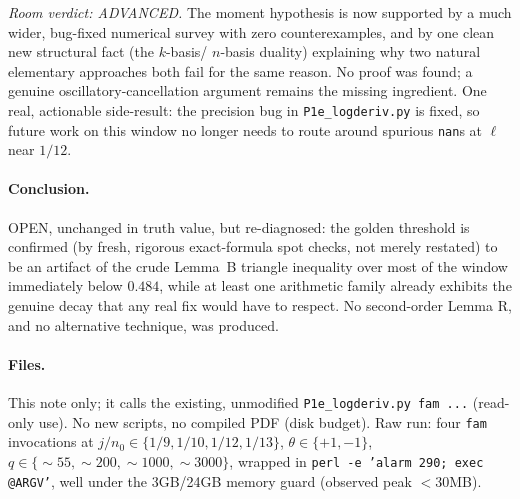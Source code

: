\documentclass[11pt]{article}
\theoremstyle{remark}\newtheorem{remark}[theorem]{Remark}
\begin{document}
\emph{Room verdict: ADVANCED.} The moment hypothesis is now supported by a much wider, bug-fixed
numerical survey with zero counterexamples, and by one clean new structural fact (the $k$-basis/
$n$-basis duality) explaining why two natural elementary approaches both fail for the same reason.
No proof was found; a genuine oscillatory-cancellation argument remains the missing ingredient.
One real, actionable side-result: the precision bug in \texttt{P1e\_logderiv.py} is fixed, so
future work on this window no longer needs to route around spurious \texttt{nan}s at $\ell$ near
$1/12$.

\paragraph{Conclusion.} OPEN, unchanged in truth value, but re-diagnosed: the golden threshold is confirmed (by fresh, rigorous exact-formula spot checks, not merely restated) to be an artifact of the crude Lemma~B triangle inequality over most of the window immediately below $0.484$, while at least one arithmetic family already exhibits the genuine decay that any real fix would have to respect. No second-order Lemma R, and no alternative technique, was produced.

\paragraph{Files.} This note only; it calls the existing, unmodified \texttt{P1e\_logderiv.py fam ...} (read-only use). No new scripts, no compiled PDF (disk budget). Raw run: four \texttt{fam} invocations at $j/n_0\in\{1/9,1/10,1/12,1/13\}$, $\theta\in\{+1,-1\}$, $q\in\{\sim55,\sim200,\sim1000,\sim3000\}$, wrapped in \texttt{perl -e 'alarm 290; exec @ARGV'}, well under the 3GB/24GB memory guard (observed peak $<30$MB).
\end{document}
